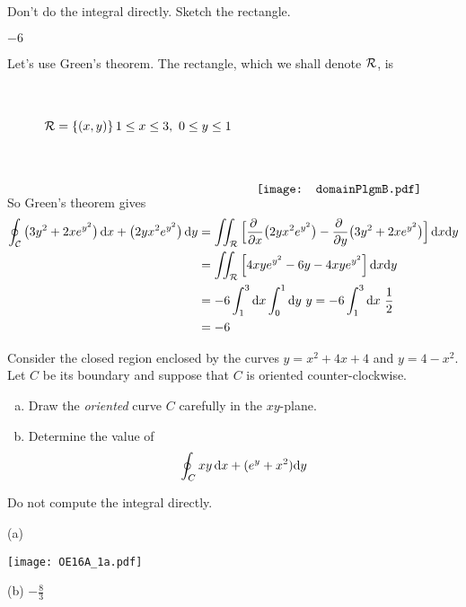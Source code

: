\begin{hint} 
Don't do the integral directly. Sketch the rectangle.
\end{hint}

\begin{answer} 
$-6$
\end{answer}

\begin{solution} 
Let's use Green's theorem. The
rectangle, which we shall denote $\mathcal{R}$, is
\vskip0.25in
\begin{align*}
\cR=\set{(x,y)}{1\le x\le 3,\ 0\le y\le 1}
\qquad\raisebox{-50pt}[40pt][40pt]{\texttt{[image: domainPlgmB.pdf]}}
\end{align*}
\vskip0.15in
\item{}So Green's theorem gives
\begin{align*}
\oint_\cC\big(3y^2+2xe^{y^2}\big)\,\dee{x} + \big(2yx^2 e^{y^2}\big)\,\dee{y}
&=\dblInt_\cR \Big[
      \pdiff{}{x}\big(2yx^2 e^{y^2}\big)  
     -\pdiff{}{y}\big(3y^2+2xe^{y^2}\big)  
   \Big]\,\dee{x} \dee{y} \\
&=\dblInt_\cR \Big[
      4xy e^{y^2}
     -6y -4xye^{y^2}
   \Big]\,\dee{x} \dee{y} \\
& = -6 \int_1^3 \dee{x}\int_0^1 \dee{y}\ y 
       = -6 \int_1^3 \dee{x}\ \frac{1}{2} \\
&=-6
\end{align*}
\end{solution}

\begin{question}[M317 2016A] %
Consider the closed region enclosed by the curves 
$y = x^2 + 4x + 4$ and $y = 4 - x^2$. Let
$C$ be its boundary and suppose that $C$ is oriented counter-clockwise.
\begin{enumerate}[(a)]
\item
   Draw the \emph{oriented} curve $C$ carefully in the $xy$-plane.
\item
    Determine the value of
    \begin{equation*}
         \oint_C xy\, \mathrm{d}x + (e^y + x^2 ) \mathrm{d}y
     \end{equation*}
\end{enumerate}

\end{question}

\begin{hint} 
Do not compute the integral directly.
\end{hint}

\begin{answer}
(a)
\begin{center}
       \texttt{[image: OE16A\_1a.pdf]}
\end{center}

 
(b) $-\frac{8}{3}$
\end{answer}

